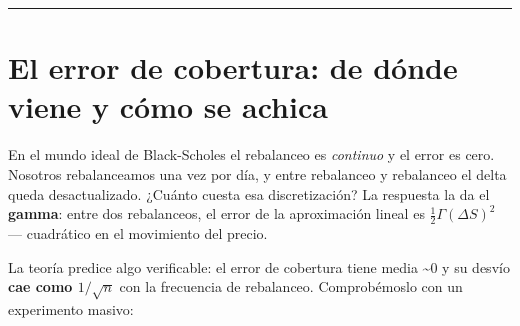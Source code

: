 \documentclass[
  spanish,
  letterpaper,
  DIV=11,
  numbers=noendperiod]{scrreprt}
\begin{document}
\begin{center}\rule{0.5\linewidth}{0.5pt}\end{center}

\chapter{El error de cobertura: de dónde viene y cómo se
achica}\label{el-error-de-cobertura-de-duxf3nde-viene-y-cuxf3mo-se-achica}

En el mundo ideal de Black-Scholes el rebalanceo es \emph{continuo} y el
error es cero. Nosotros rebalanceamos una vez por día, y entre
rebalanceo y rebalanceo el delta queda desactualizado. ¿Cuánto cuesta
esa discretización? La respuesta la da el \textbf{gamma}: entre dos
rebalanceos, el error de la aproximación lineal es
\(\tfrac{1}{2}\Gamma (\Delta S)^2\) --- cuadrático en el movimiento del
precio.

La teoría predice algo verificable: el error de cobertura tiene media
\textasciitilde0 y su desvío \textbf{cae como \(1/\sqrt{n}\)} con la
frecuencia de rebalanceo. Comprobémoslo con un experimento masivo:
\end{document}
